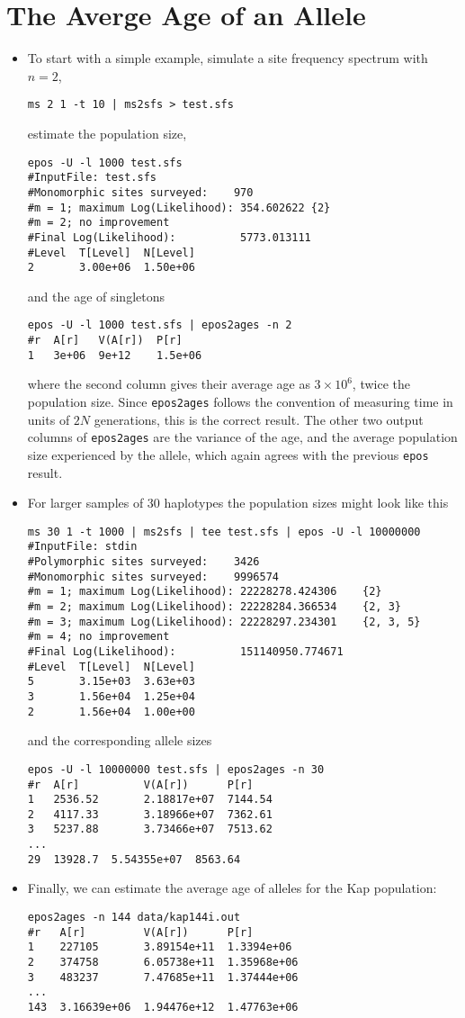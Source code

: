 \documentclass[a4paper, english]{article}
\newcommand{\ty}{\texttt}
\begin{document}
\section{The Averge Age of an Allele}
\begin{itemize}
  \item To start with a simple example, simulate a site frequency spectrum with $n=2$,
\begin{verbatim}
ms 2 1 -t 10 | ms2sfs > test.sfs
\end{verbatim}
estimate the population size,
\begin{verbatim}
epos -U -l 1000 test.sfs
#InputFile:	test.sfs
#Monomorphic sites surveyed:	970
#m = 1; maximum Log(Likelihood): 354.602622	{2}
#m = 2; no improvement
#Final Log(Likelihood):          5773.013111
#Level  T[Level]  N[Level]
2       3.00e+06  1.50e+06
\end{verbatim}
and the age of singletons
\begin{verbatim}
epos -U -l 1000 test.sfs | epos2ages -n 2
#r  A[r]   V(A[r])  P[r]
1   3e+06  9e+12    1.5e+06
\end{verbatim}
where the second column gives their average age as $3\times 10^6$,
twice the population size. Since \ty{epos2ages} follows the convention
of measuring time in units of $2N$ generations, this is the correct
result. The other two output columns of \ty{epos2ages} are the
variance of the age, and the average population size experienced by
the allele, which again agrees with the previous \ty{epos} result.
\item For larger samples of 30 haplotypes the population sizes might look like this
\begin{verbatim}
ms 30 1 -t 1000 | ms2sfs | tee test.sfs | epos -U -l 10000000 
#InputFile:	stdin
#Polymorphic sites surveyed:	3426
#Monomorphic sites surveyed:	9996574
#m = 1; maximum Log(Likelihood): 22228278.424306	{2}
#m = 2; maximum Log(Likelihood): 22228284.366534	{2, 3}
#m = 3; maximum Log(Likelihood): 22228297.234301	{2, 3, 5}
#m = 4; no improvement
#Final Log(Likelihood):          151140950.774671
#Level  T[Level]  N[Level]
5       3.15e+03  3.63e+03
3       1.56e+04  1.25e+04
2       1.56e+04  1.00e+00
\end{verbatim}
and the corresponding allele sizes
\begin{verbatim}
epos -U -l 10000000 test.sfs | epos2ages -n 30
#r  A[r]          V(A[r])      P[r]
1   2536.52       2.18817e+07  7144.54
2   4117.33       3.18966e+07  7362.61
3   5237.88       3.73466e+07  7513.62
...
29  13928.7  5.54355e+07  8563.64
\end{verbatim}
\item Finally, we can estimate the average age of alleles for the Kap
  population:
\begin{verbatim}
epos2ages -n 144 data/kap144i.out
#r   A[r]         V(A[r])      P[r]
1    227105       3.89154e+11  1.3394e+06
2    374758       6.05738e+11  1.35968e+06
3    483237       7.47685e+11  1.37444e+06
...
143  3.16639e+06  1.94476e+12  1.47763e+06
\end{verbatim}  
\end{itemize}
\end{document}
